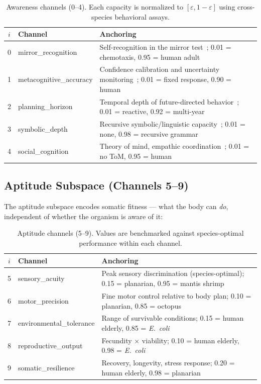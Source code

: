 \documentclass[
  aps,
  prd,
  twocolumn,
  superscriptaddress,
  nofootinbib,
  floatfix
]{revtex4-2}
\newcommand{\eps}{\varepsilon}
\begin{document}
\begin{table}[h]
\caption{\label{tab:awareness}Awareness channels (0--4).
Each capacity is normalized to $[\eps, 1{-}\eps]$ using
cross-species behavioral assays.}
\begin{ruledtabular}
\begin{tabular}{clp{3.5cm}}
$i$ & Channel & Anchoring \\
\hline
0 & mirror\_recognition & Self-recognition in the mirror
    test~\cite{gallup1970}; 0.01 = chemotaxis,
    0.95 = human adult \\
1 & metacognitive\_accuracy & Confidence calibration and
    uncertainty monitoring~\cite{smith2009metacognition};
    0.01 = fixed response, 0.90 = human \\
2 & planning\_horizon & Temporal depth of future-directed
    behavior~\cite{suddendorf2007evolution};
    0.01 = reactive, 0.92 = multi-year \\
3 & symbolic\_depth & Recursive symbolic/linguistic
    capacity~\cite{hauser2002faculty};
    0.01 = none, 0.98 = recursive grammar \\
4 & social\_cognition & Theory of mind, empathic
    coordination~\cite{premack1978chimpanzee};
    0.01 = no ToM, 0.95 = human \\
\end{tabular}
\end{ruledtabular}
\end{table}

\subsection{Aptitude Subspace (Channels 5--9)}

The aptitude subspace encodes somatic fitness --- what the
body can \emph{do}, independent of whether the organism is
aware of it:

\begin{table}[h]
\caption{\label{tab:aptitude}Aptitude channels (5--9).
Values are benchmarked against species-optimal performance
within each channel.}
\begin{ruledtabular}
\begin{tabular}{clp{3.5cm}}
$i$ & Channel & Anchoring \\
\hline
5 & sensory\_acuity & Peak sensory discrimination
    (species-optimal); 0.15 = planarian,
    0.95 = mantis shrimp \\
6 & motor\_precision & Fine motor control relative to
    body plan; 0.10 = planarian,
    0.85 = octopus \\
7 & environmental\_tolerance & Range of survivable conditions;
    0.15 = human elderly, 0.85 = \textit{E.~coli} \\
8 & reproductive\_output & Fecundity $\times$ viability;
    0.10 = human elderly, 0.98 = \textit{E.~coli} \\
9 & somatic\_resilience & Recovery, longevity, stress
    response; 0.20 = human elderly,
    0.98 = planarian \\
\end{tabular}
\end{ruledtabular}
\end{table}
\end{document}
